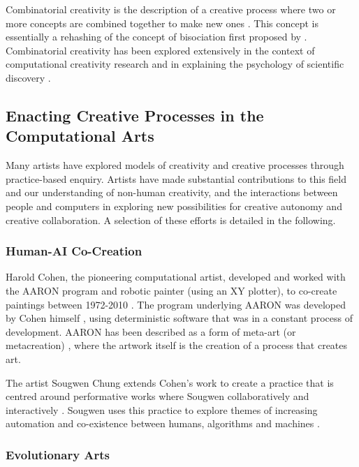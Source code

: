 Combinatorial creativity is the description of a creative process where two or more concepts are combined together to make new ones \citep{boden2004creative}. 
This concept is essentially a rehashing of the concept of bisociation first proposed by \cite{koestler1964act}. 
Combinatorial creativity has been explored extensively in the context of computational creativity research \citep{zarraonandia2017using, guzdial2018combinets, guzdial2018combinatorial} and in explaining the psychology of scientific discovery \citep{simonton2021scientific, simonton2022serendipity}.

\subsection{Enacting Creative Processes in the Computational Arts}

Many artists have explored models of creativity and creative processes through practice-based enquiry.
Artists have made substantial contributions to this field and our understanding of non-human creativity, and the interactions between people and computers in exploring new possibilities for creative autonomy and creative collaboration.
A selection of these efforts is detailed in the following.

\subsubsection{Human-AI Co-Creation}

Harold Cohen, the pioneering computational artist, developed and worked with the AARON program and robotic painter (using an XY plotter), to co-create paintings between 1972-2010 \citep{cohen2016harold}. 
The program underlying AARON was developed by Cohen himself \citep{cohen1995further}, using deterministic software that was in a constant process of development. 
AARON has been described as a form of meta-art (or metacreation) \citep{mccorduck1991aaron}, where the artwork itself is the creation of a process that creates art.

The artist Sougwen Chung extends Cohen's work to create a practice that is centred around performative works where Sougwen collaboratively and interactively \citep{benediktsson2019human}.
Sougwen uses this practice to explore themes of increasing automation and co-existence between humans, algorithms and machines \citep{voss2021conversation}.

\subsubsection{Evolutionary Arts}

